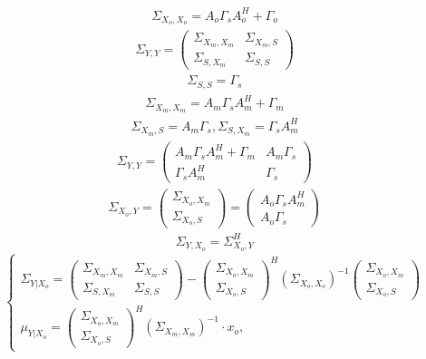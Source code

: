 \documentclass[11pt]{article}
\begin{document}
\begin{gather}
\Sigma_{X_o,X_o}=A_o\Gamma_sA_o^H+\Gamma_o
\end{gather}
\begin{gather}
\Sigma_{Y,Y} = \begin{pmatrix}
\Sigma_{X_m, X_m}&\Sigma_{X_m, S}\\
\Sigma_{S, X_m}&\Sigma_{S, S}
\end{pmatrix}
\end{gather}
\begin{gather}
\Sigma_{S,S} = \Gamma_s
\end{gather}
\begin{gather}
\Sigma_{X_m,X_m} = A_m \Gamma_s A_m^H + \Gamma_m
\end{gather}
\begin{gather}
\Sigma_{X_m,S} = A_m \Gamma_s, \Sigma_{S, X_m} = \Gamma_s A_m^H 
\end{gather}
\begin{gather}
\Sigma_{Y,Y} = \begin{pmatrix}
A_m \Gamma_s A_m^H + \Gamma_m&A_m \Gamma_s\\
\Gamma_s A_m^H&\Gamma_s
\end{pmatrix}
\end{gather}
\begin{gather}
\Sigma_{X_o,Y}
= \begin{pmatrix}
\Sigma_{X_o,X_m}\\
\Sigma_{X_o,S}
\end{pmatrix}= 
\begin{pmatrix}
A_o\Gamma_s A_m^H\\
A_o\Gamma_s
\end{pmatrix}
\end{gather}
\begin{gather}
\Sigma_{Y,X_o}
= \Sigma_{X_o,Y}^H
\end{gather}
\begin{equation}
\left\{ \begin{gathered} 
\Sigma_{Y|X_o} = \begin{pmatrix}
\Sigma_{X_m, X_m}&\Sigma_{X_m, S}\\
\Sigma_{S, X_m}&\Sigma_{S, S}
\end{pmatrix}-\begin{pmatrix}
\Sigma_{X_o,X_m}\\
\Sigma_{X_o,S}
\end{pmatrix}^H(\Sigma_{X_o,X_o})^{-1}\begin{pmatrix}
\Sigma_{X_o,X_m}\\
\Sigma_{X_o,S}
\end{pmatrix} \\
\mu_{Y|X_o} =   \begin{pmatrix}
\Sigma_{X_o,X_m}\\
\Sigma_{X_o,S}
\end{pmatrix}^H(\Sigma_{X_m,X_m})^{-1}\cdot x_o,
\end{gathered} \right.
\end{equation}
\end{document}
